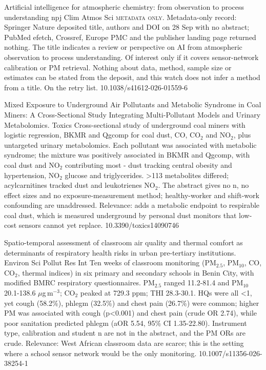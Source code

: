 \documentclass[10pt]{article}
\begin{document}
{Artificial intelligence for atmospheric chemistry: from observation to process understanding}
{npj Clim Atmos Sci}
{\textsc{metadata only.} Metadata-only record: Springer Nature deposited title, authors and DOI on 28 Sep with no abstract; PubMed efetch, Crossref, Europe PMC and the publisher landing page returned nothing. The title indicates a review or perspective on AI from atmospheric observation to process understanding. Of interest only if it covers sensor-network calibration or PM retrieval. Nothing about data, method, sample size or estimates can be stated from the deposit, and this watch does not infer a method from a title. On the retry list.}
{10.1038/s41612-026-01559-6}

\par{}\baselineskip{}\baselineskip
{}

{Mixed Exposure to Underground Air Pollutants and Metabolic Syndrome in Coal Miners: A Cross-Sectional Study Integrating Multi-Pollutant Models and Urinary Metabolomics.}
{Toxics}
{Cross-sectional study of underground coal miners with logistic regression, BKMR and Qgcomp for coal dust, CO, CO$_2$ and NO$_2$, plus untargeted urinary metabolomics. Each pollutant was associated with metabolic syndrome; the mixture was positively associated in BKMR and Qgcomp, with coal dust and NO$_2$ contributing most - dust tracking central obesity and hypertension, NO$_2$ glucose and triglycerides. >113 metabolites differed; acylcarnitines tracked dust and leukotrienes NO$_2$. The abstract gives no n, no effect sizes and no exposure-measurement method; healthy-worker and shift-work confounding are unaddressed. Relevance: adds a metabolic endpoint to respirable coal dust, which is measured underground by personal dust monitors that low-cost sensors cannot yet replace.}
{10.3390/toxics14090746}

{Spatio-temporal assessment of classroom air quality and thermal comfort as determinants of respiratory health risks in urban pre-tertiary institutions.}
{Environ Sci Pollut Res Int}
{Ten weeks of classroom monitoring (PM$_{2.5}$, PM$_{10}$, CO, CO$_2$, thermal indices) in six primary and secondary schools in Benin City, with modified BMRC respiratory questionnaires. PM$_{2.5}$ ranged 11.2-81.4 and PM$_{10}$ 20.1-138.6 $\mu$g\,m$^{-3}$; CO$_2$ peaked at 729.3 ppm; THI 28.3-30.1. HQs were all <1, yet cough (58.2\%), phlegm (32.5\%) and chest pain (26.7\%) were common; higher PM was associated with cough (p<0.001) and chest pain (crude OR 2.74), while poor sanitation predicted phlegm (aOR 5.54, 95\% CI 1.35-22.80). Instrument type, calibration and student n are not in the abstract, and the PM ORs are crude. Relevance: West African classroom data are scarce; this is the setting where a school sensor network would be the only monitoring.}
{10.1007/s11356-026-38254-1}
\end{document}
